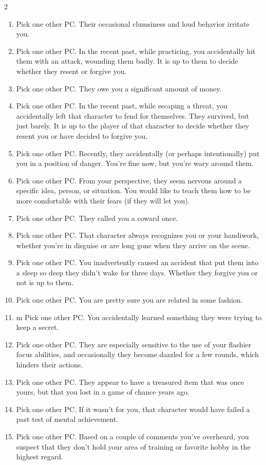 \begin{multicols}{2}
\begin{enumerate}
\item Pick one other PC. Their occasional clumsiness and loud behavior irritate you.
\item Pick one other PC. In the recent past, while practicing, you accidentally hit them with an attack, wounding them badly. It is up to them to decide whether they resent or forgive you.
\item Pick one other PC. They owe you a significant amount of money.
\item Pick one other PC. In the recent past, while escaping a threat, you accidentally left that character to fend for themselves. They survived, but just barely. It is up to the player of that character to decide whether they resent you or have decided to forgive you.
\item Pick one other PC. Recently, they accidentally (or perhaps intentionally) put you in a position of danger. You’re fine now, but you’re wary around them.
\item Pick one other PC. From your perspective, they seem nervous around a specific idea, person, or situation. You would like to teach them how to be more comfortable with their fears (if they will let you).
\item Pick one other PC. They called you a coward once.
\item Pick one other PC. That character always recognizes you or your handiwork, whether you’re in disguise or are long gone when they arrive on the scene. 
\item Pick one other PC. You inadvertently caused an accident that put them into a sleep so deep they didn’t wake for three days. Whether they forgive you or not is up to them.
\item Pick one other PC. You are pretty sure you are related in some fashion.
\item m Pick one other PC. You accidentally learned something they were trying to keep a secret.
\item Pick one other PC. They are especially sensitive to the use of your flashier focus abilities, and occasionally they become dazzled for a few rounds, which hinders their actions.
\item Pick one other PC. They appear to have a treasured item that was once yours, but that you lost in a game of chance years ago.
\item Pick one other PC. If it wasn’t for you, that character would have failed a past test of mental achievement.
\item Pick one other PC. Based on a couple of comments you’ve overheard, you suspect that they don’t hold your area of training or favorite hobby in the highest regard.

\end{enumerate}
\end{multicols}
